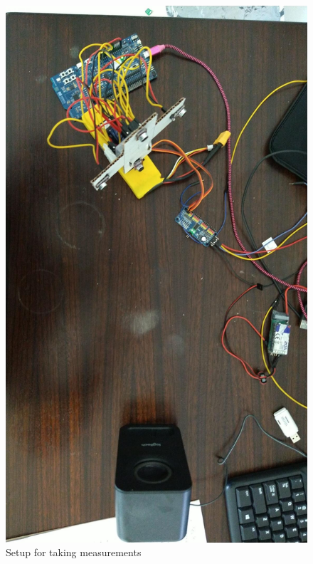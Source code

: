 \documentclass[a4paper]{article}
\begin{document}
\begin{figure}[H]
    \begin{center}
        \includegraphics[angle=90,width=\linewidth]{assets/test_setup.jpeg}
        \caption{Setup for taking measurements}
        \label{fig:test_setup}
    \end{center}
\end{figure}
\end{document}
